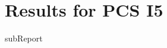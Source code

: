 \renewcommand{\DTRPcs}{I5} %
\renewcommand{\DTRPcsLong}{I5}


    \section{Results for PCS \DTRPcsLong}

    {{subReport}}
    \newpage

